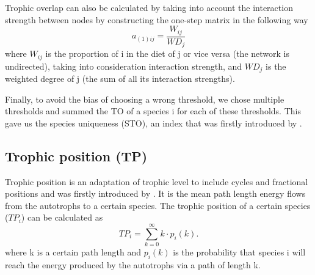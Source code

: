 \documentclass[twocolumn]{article}
\begin{document}
        \par Trophic overlap can also be calculated by taking into account the interaction strength between nodes by constructing the one-step matrix in the following way \citep{Xiao2019}
        \begin{equation}
            a_{(1)ij}=\frac{W_{ij}}{WD_j}    
        \end{equation}
        where $W_{ij}$ is the proportion of i in the diet of j or vice versa (the network is undirected), taking into consideration interaction strength, and $WD_j$ is the weighted degree of j (the sum of all its interaction strengths). %
        \par Finally, to avoid the bias of choosing a wrong threshold, we chose multiple thresholds and summed the TO of a species i for each of these thresholds. This gave us the species uniqueness (STO), an index that was firstly introduced by \citet{Lai2015}. 
    \subsection*{Trophic position (TP)}
        Trophic position is an adaptation of trophic level to include cycles and fractional positions and was firstly introduced by \citet{Levine1980}. It is the mean path length energy flows from the autotrophs to a certain species. The trophic position of a certain species ($TP_i$) can be calculated as
        \begin{equation}
            TP_i=\sum\limits_{k=0}^\infty k \cdot p_i(k).
        \end{equation}
        where k is a certain path length and $p_i(k)$ is the probability that species i will reach the energy produced by the autotrophs via a path of length k.
\end{document}
